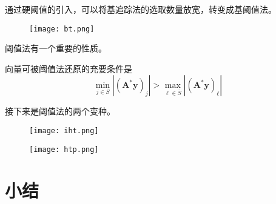 通过硬阈值的引入，可以将基追踪法的选取数量放宽，转变成基阈值法。\par
\begin{figure}[!htbp]
    \centering
    \texttt{[image: bt.png]}
\end{figure}
阈值法有一个重要的性质。
\begin{proposition}
    向量可被阈值法还原的充要条件是
    \begin{equation}
        \min _{j \in S}\left|\left(\mathbf{A}^* \mathbf{y}\right)_j\right|>\max _{\ell \in \bar{S}}\left|\left(\mathbf{A}^* \mathbf{y}\right)_{\ell}\right|
    \end{equation}
\end{proposition}
接下来是阈值法的两个变种。
\begin{figure}[!htbp]
    \centering
    \texttt{[image: iht.png]}
\end{figure}
\begin{figure}[!htbp]
    \centering
    \texttt{[image: htp.png]}
\end{figure}
\section{小结}